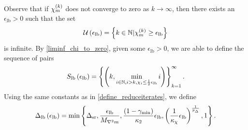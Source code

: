 Observe that if ${\chi_m^{(k)}}$ does not converge to zero as $k \rightarrow \infty$, then 
 there exists an $\epsilon_{\textrm{lb}} > 0$ such that the set
\begin{align}
{\mathcal U\left(\epsilon_{\textrm{lb}}\right)} = \left\{k \in \mathbb N | {\chi_m^{(k)}} \ge {\epsilon_{\textrm{lb}}} \right\} \label{define_the_finite_set}
\end{align}
is infinite.
By \cref{liminf_chi_to_zero}, given some $\epsilon_{\textrm{lb}} > 0$, we are able to define the sequence of pairs
\begin{align}
\label{define_slb}
{S_{\textrm{lb}}\left(\epsilon_{\textrm{lb}}\right)} = \left\{\left(k,
\min_{i \in \mathbb N, i > k, \chi_{i} \le \frac 1 2 {\epsilon_{\textrm{lb}}}} i
\right)\right\}_{k=1}^{\infty}.
\end{align}
Using the same constants as in \cref{define_reduceiterates}, we define
\begin{align}
{\Delta_{\textrm{lb}}\left(\epsilon_{\textrm{lb}}\right)} = \min\left\{
{\Delta_{\textrm{sr}}},
\frac{{\epsilon_{\textrm{lb}}}}{{M_{\nabla^2 m}}}, 
\frac{(1-\gamma_{\textrm{min}})}{{\kappa_2}}{\epsilon_{\textrm{lb}}}, 
\left(\frac 1 {\kappa_{\chi}} {\epsilon_{\textrm{lb}}} \right)^{\frac 1 {p_{\Delta}}}, 
1
\right\}. \label{define_delta_lb}
\end{align}



